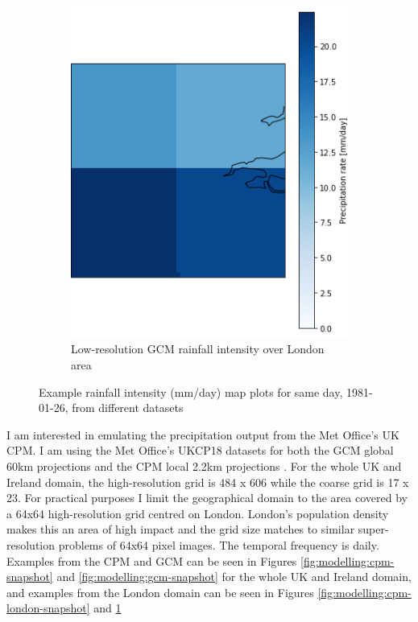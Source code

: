 \begin{figure}[hp]
\begin{subfigure}{0.45\textwidth}
        \includegraphics[width=1.0\linewidth]{../figures/modelling/gcm-london-pr-1981-01-26.png}
        \caption{Low-resolution GCM rainfall intensity over London area}
        \label{fig:modelling:gcm-london-snapshot}
    \end{subfigure}

    \caption{Example rainfall intensity (mm/day) map plots for same day, 1981-01-26, from different datasets}
    \label{fig:modelling:example-rainfall-maps}
\end{figure}

I am interested in emulating the precipitation output from the Met Office's UK CPM. I am using the Met Office's UKCP18 datasets for both the GCM global 60km projections \cite{ukcp18global} and the CPM local 2.2km projections \cite{ukcp18local}. For the whole UK and Ireland domain, the high-resolution grid is 484 x 606 while the coarse grid is 17 x 23. For practical purposes I limit the geographical domain to the area covered by a 64x64 high-resolution grid centred on London. London's population density makes this an area of high impact and the grid size matches to similar super-resolution problems of 64x64 pixel images. The temporal frequency is daily. Examples from the CPM and GCM can be seen in Figures \ref{fig:modelling:cpm-snapshot} and \ref{fig:modelling:gcm-snapshot} for the whole UK and Ireland domain, and examples from the London domain can be seen in Figures \ref{fig:modelling:cpm-london-snapshot} and \ref{fig:modelling:gcm-london-snapshot}

